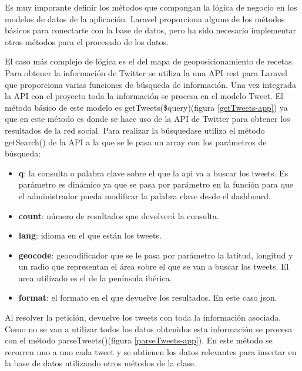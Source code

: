 Es muy imporante definir los métodos que compongan la lógica de negocio en los modelos de datos de la aplicación. Laravel proporciona alguno de los métodos básicos para conectarte con la base de datos, pero ha sido necesario implementar otros métodos para el procesado de los datos.

El caso más complejo de lógica es el del mapa de geoposicionamiento de recetas. Para obtener la información de Twitter se utiliza la una API rest para Laravel que proporciona varias funciones de búsqueda de información. Una vez integrada la API con el proyecto toda la información se procesa en el modelo Tweet. El método básico de este modelo es getTweets(\$query)(figura \ref{getTweets-app}) ya que en este método es donde se hace uso de la API de Twitter para obtener los resultados de la red social. Para realizar la búsquedase utiliza el método getSearch() de la API a la que se le pasa un array con los parámetros de búsqueda:

\begin{itemize}

\item \textbf{q}: la consulta o palabra clave sobre el que la api va a buscar los tweets. Es parámetro es dinámico ya que se pasa por parámetro en la función para que el administrador pueda modificar la palabra clave desde el dashboard.

\item \textbf{count}: número de resultados que devolverá la consulta.

\item \textbf{lang}: idioma en el que están los tweets.

\item \textbf{geocode}: geocodificador que se le pasa por parámetro la latitud, longitud y un radio que representan el área sobre el que se van a buscar los tweets. El area utilizado es el de la península ibérica.

\item \textbf{format}: el formato en el que devuelve los resultados. En este caso json.

\end{itemize} 


Al resolver la petición, devuelve los tweets con toda la información asociada. Como no se van a utilizar todos los datos obtenidos esta información se procesa con el método parseTweets()(figura \ref{parseTweets-app}). En este método se recorren uno a uno cada tweet y se obtienen los datos relevantes para insertar en la base de datos utilizando otros métodos de la clase.



